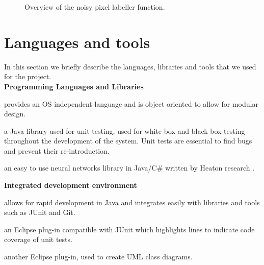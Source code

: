 \documentclass[12pt,twoside,notitlepage]{report}
\begin{document}
\begin{figure}[H]
{\begin{tikzpicture}[node distance=2cm,>=stealth',bend angle=45,auto]
                                    
                            \end{tikzpicture}
                        }

                    \caption{Overview of the noisy pixel labeller function.}
                \end{figure} 







    \section{Languages and tools}
        In this section we briefly describe the languages, libraries and tools that we used for the project. \\

        \noindent\textbf{Programming Languages and Libraries}
            \begin{description}[font=\normalfont\itshape, labelindent=10pt]
                \item[Java:] provides an OS independent language and is object oriented to allow for modular design.
                \item[JUnit:] a Java library used for unit testing, used for white box and black box testing throughout 
                    the development of the system. Unit tests are essential to find bugs and prevent their re-introduction.
                \item[Encog:] an easy to use neural networks library in Java/C\# written by Heaton research \cite{JMLR:v16:heaton15a}. 
            \end{description}

        \noindent\textbf{Integrated development environment}
            \begin{description}[font=\normalfont\itshape, labelindent=10pt]
                \item[Eclipse:] allows for rapid development in Java and integrates easily with libraries and tools such 
                    as JUnit and Git.
                \item[EclEmma:] an Eclipse plug-in compatible with JUnit which highlights lines to indicate code coverage 
                    of unit tests.
                \item[ObjectAid:] another Eclipse plug-in, used to create UML class diagrams.
            \end{description}
\end{document}
